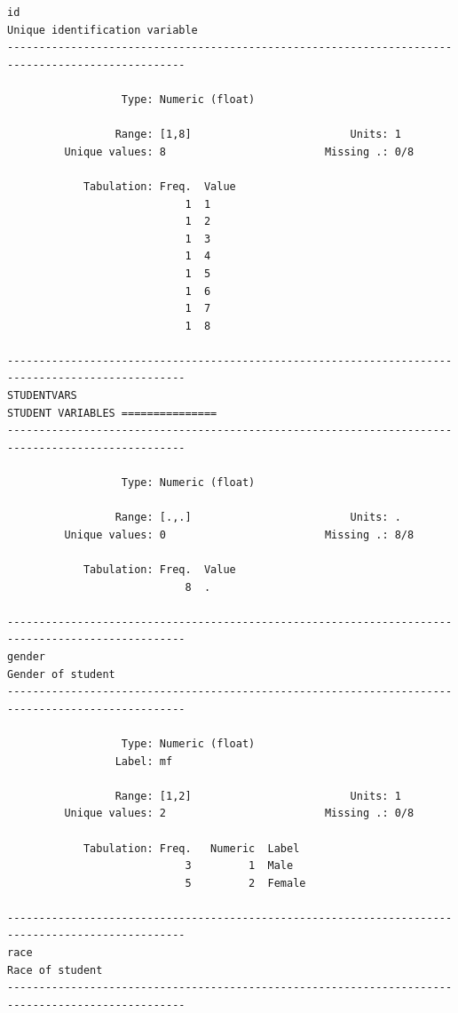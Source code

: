 \documentclass[
]{book}
\begin{document}
\begin{verbatim}
id                                                                  Unique identification variable
--------------------------------------------------------------------------------------------------

                  Type: Numeric (float)

                 Range: [1,8]                         Units: 1
         Unique values: 8                         Missing .: 0/8

            Tabulation: Freq.  Value
                            1  1
                            1  2
                            1  3
                            1  4
                            1  5
                            1  6
                            1  7
                            1  8

--------------------------------------------------------------------------------------------------
STUDENTVARS                                                      STUDENT VARIABLES ===============
--------------------------------------------------------------------------------------------------

                  Type: Numeric (float)

                 Range: [.,.]                         Units: .
         Unique values: 0                         Missing .: 8/8

            Tabulation: Freq.  Value
                            8  .

--------------------------------------------------------------------------------------------------
gender                                                                           Gender of student
--------------------------------------------------------------------------------------------------

                  Type: Numeric (float)
                 Label: mf

                 Range: [1,2]                         Units: 1
         Unique values: 2                         Missing .: 0/8

            Tabulation: Freq.   Numeric  Label
                            3         1  Male
                            5         2  Female

--------------------------------------------------------------------------------------------------
race                                                                               Race of student
--------------------------------------------------------------------------------------------------


\end{verbatim}
\end{document}

